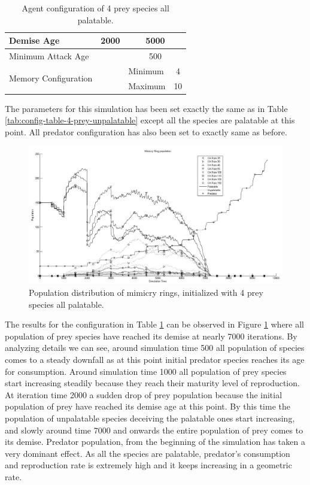 \begin{table}[H]
\begin{tabular}{|l|l|c|c|l|c|}
  Demise Age	 									 & \multicolumn{3}{|c|}{2000}							& \multicolumn{2}{|c|}{5000} \\ \hline
  Minimum Attack Age						 & \multicolumn{3}{|c|}{} 						    & \multicolumn{2}{|c|}{500} \\ \hline
  \multirow{2}{*}{Memory Configuration} & \multicolumn{3}{|c|}{} 					& Minimum & 4 \\ \cline{5-6}
   																			& \multicolumn{3}{|c|}{} 					& Maximum & 10 \\ \hline  
\end{tabular}
\caption{Agent configuration of 4 prey species all palatable.}
\label{tab:config-table-4-prey-palatable}
\end{table}

The parameters for this simulation has been set exactly the same as in Table \ref{tab:config-table-4-prey-unpalatable} except all the species are palatable at this point. All predator configuration has also been set to exactly same as before.

\begin{figure}[H]
	\centering
	\includegraphics[scale=0.40]{images/simTime-9k-4Prey-p}
	\caption{Population distribution of mimicry rings, initialized with 4 prey species all palatable.}
	\label{fig:plot-4-prey-p}
\end{figure}

The results for the configuration in Table \ref{tab:config-table-4-prey-palatable} can be observed in Figure \ref{fig:plot-4-prey-p} where all population of prey species have reached its demise at nearly 7000 iterations. By analyzing details we can see, around simulation time 500 all population of species comes to a steady downfall as at this point initial predator species reaches its age for consumption. Around simulation time 1000 all population of prey species start increasing steadily because they reach their maturity level of reproduction. At iteration time 2000 a sudden drop of prey population because the initial population of prey have reached its demise age at this point. By this time the population of unpalatable species deceiving the palatable ones start increasing, and slowly around time 7000 and onwards the entire population of prey comes to its demise. Predator population, from the beginning of the simulation has taken a very dominant effect. As all the species are palatable, predator's consumption and reproduction rate is extremely high and it keeps increasing in a geometric rate.

